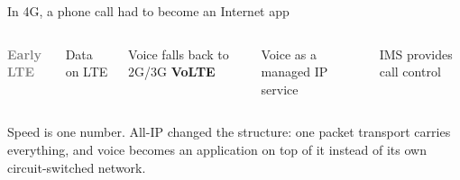 \begin{frame}{In 4G, a phone call had to become an Internet app}
  \vspace{0.4em}
  \begin{columns}[T,onlytextwidth]
      \centering
      \Huge\textcolor{gray}{\textbf{Early LTE}}

      \vspace{0.8em}
      \large Data on LTE\par
      \vspace{0.3em}
      Voice falls back to 2G/3G
      \centering
      \Huge\textcolor{ranblue}{\textbf{VoLTE}}

      \vspace{0.8em}
      \large Voice as a managed IP service\par
      \vspace{0.3em}
      IMS provides call control
  \end{columns}


  \vspace{1.0em}
     {Speed is one number. All-IP changed the structure: one packet transport
      carries everything, and voice becomes an application on top of it instead
      of its own circuit-switched network.}
\end{frame}

